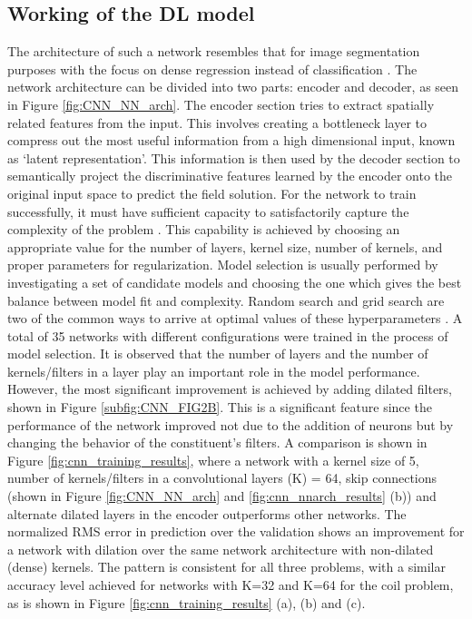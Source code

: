 \subsection{Working of the DL model}\label{sec:Work_CNN}
The architecture of such a network resembles that for image segmentation purposes with the focus on dense regression instead of classification \parencite{badrinarayanan2017segnet}.
The network architecture can be divided into two parts: encoder and decoder, as seen in Figure \ref{fig:CNN_NN_arch}.  The encoder section tries to extract spatially related features from the input. This involves creating a bottleneck layer to compress out the most useful information from a high dimensional input, known as `latent representation'. This information is then used by the decoder section to semantically project the discriminative features learned by the encoder onto the original input space to predict the field solution.  For the network to train successfully, it must have sufficient capacity to satisfactorily capture the complexity of the problem \parencite{ghorbanian2017computer}. This capability is achieved by choosing an appropriate value for the number of layers, kernel size, number of kernels, and proper parameters for regularization. 
Model selection is usually performed by investigating a set of candidate models and choosing the one which gives the best balance between model fit and complexity. Random search and grid search are two of the common ways to arrive at optimal values of these hyperparameters \parencite{geron2019hands}. A total of 35 networks with different configurations were trained in the process of model selection. It is observed that the number of layers and the number of kernels/filters in a layer play an important role in the model performance. However, the most significant improvement is achieved by adding dilated filters, shown in Figure \ref{subfig:CNN_FIG2B}. This is a significant feature since the performance of the network improved not due to the addition of neurons but by changing the behavior of the constituent’s filters. A comparison is shown in Figure \ref{fig:cnn_training_results}, where a network with a kernel size of 5, number of kernels/filters in a convolutional layers (K) = 64, skip connections (shown in Figure \ref{fig:CNN_NN_arch} and \ref{fig:cnn_nnarch_results} (b)) and alternate dilated layers in the encoder outperforms other networks. The normalized RMS error in prediction over the validation shows an improvement for a network with dilation over the same network architecture with non-dilated (dense) kernels. The pattern is consistent for all three problems, with a similar accuracy level achieved for networks with K=32 and K=64 for the coil problem, as is shown in Figure \ref{fig:cnn_training_results} (a), (b) and (c). 

